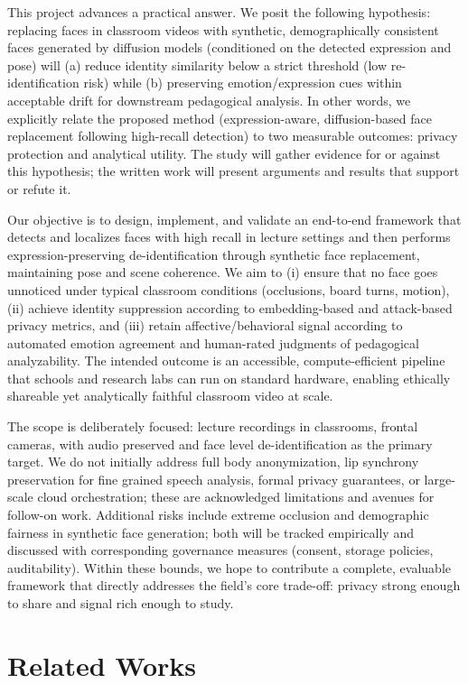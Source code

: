 \documentclass[12pt]{article}
\begin{document}
This project advances a practical answer. We posit the following hypothesis: replacing faces in classroom videos with synthetic, demographically consistent faces generated by diffusion models (conditioned on the detected expression and pose) will (a) reduce identity similarity below a strict threshold (low re-identification risk) while (b) preserving emotion/expression cues within acceptable drift for downstream pedagogical analysis. In other words, we explicitly relate the proposed method (expression-aware, diffusion-based face replacement following high-recall detection) to two measurable outcomes: privacy protection and analytical utility. The study will gather evidence for or against this hypothesis; the written work will present arguments and results that support or refute it.

Our objective is to design, implement, and validate an end-to-end framework that detects and localizes faces with high recall in lecture settings and then performs expression-preserving de-identification through synthetic face replacement, maintaining pose and scene coherence. We aim to (i) ensure that no face goes unnoticed under typical classroom conditions (occlusions, board turns, motion), (ii) achieve identity suppression according to embedding-based and attack-based privacy metrics, and (iii) retain affective/behavioral signal according to automated emotion agreement and human-rated judgments of pedagogical analyzability. The intended outcome is an accessible, compute-efficient pipeline that schools and research labs can run on standard hardware, enabling ethically shareable yet analytically faithful classroom video at scale.

The scope is deliberately focused: lecture recordings in classrooms, frontal cameras, with audio preserved and face level de-identification as the primary target. We do not initially address full body anonymization, lip synchrony preservation for fine grained speech analysis, formal privacy guarantees, or large-scale cloud orchestration; these are acknowledged limitations and avenues for follow-on work. Additional risks include extreme occlusion and demographic fairness in synthetic face generation; both will be tracked empirically and discussed with corresponding governance measures (consent, storage policies, auditability). Within these bounds, we hope to contribute a complete, evaluable framework that directly addresses the field’s core trade-off: privacy strong enough to share and signal rich enough to study.

\section{Related Works}
\end{document}
